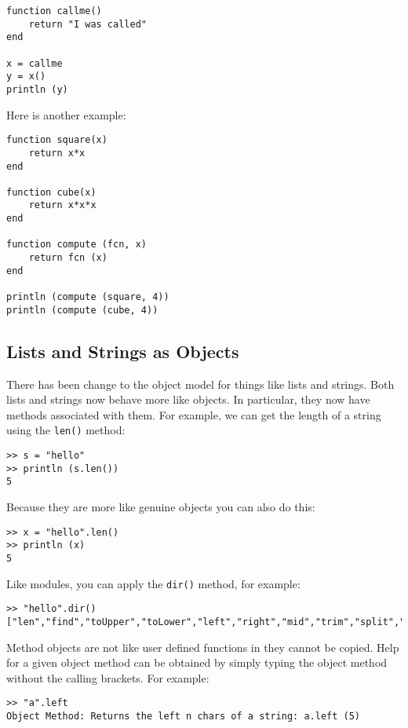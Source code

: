 \begin{lstlisting}
function callme()
    return "I was called"
end

x = callme
y = x()
println (y)
\end{lstlisting}

Here is another example:

\begin{lstlisting}
function square(x)
    return x*x
end

function cube(x)
    return x*x*x
end

function compute (fcn, x)
    return fcn (x)
end

println (compute (square, 4))
println (compute (cube, 4))
\end{lstlisting}

\subsection{Lists and Strings as Objects}

There has been change to the object model for things like lists and strings. Both lists and strings now behave more like objects. In particular, they now have methods associated with them. For example, we can get the length of a string using the {\tt len()} method:

\begin{lstlisting}
>> s = "hello"
>> println (s.len())
5
\end{lstlisting}

Because they are more like genuine objects you can also do this:

\begin{lstlisting}
>> x = "hello".len()
>> println (x)
5
\end{lstlisting}

Like modules, you can apply the {\tt dir()} method, for example:

\begin{lstlisting}
>> "hello".dir()
["len","find","toUpper","toLower","left","right","mid","trim","split","dir"]
\end{lstlisting}

Method objects are not like user defined functions in they cannot be copied. Help for a given object method can be obtained by simply typing the object method without the calling brackets. For example:

\begin{lstlisting}
>> "a".left
Object Method: Returns the left n chars of a string: a.left (5)
\end{lstlisting}

